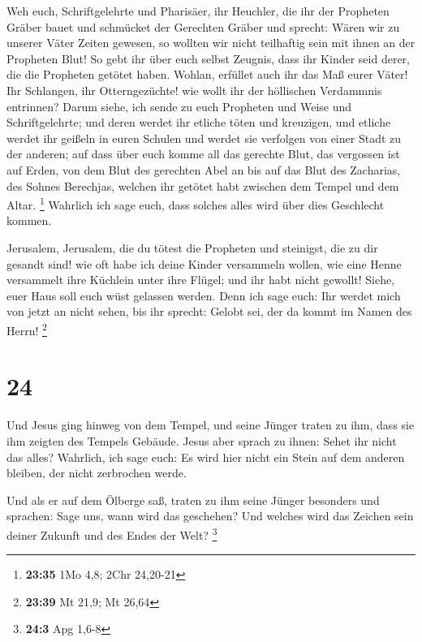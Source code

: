  Weh euch, Schriftgelehrte und Pharisäer, ihr Heuchler,
die ihr der Propheten Gräber bauet und schmücket der Gerechten Gräber
 und sprecht: Wären wir zu unserer Väter Zeiten gewesen,
so wollten wir nicht teilhaftig sein mit ihnen an der Propheten Blut!
 So gebt ihr über euch selbst Zeugnis, dass ihr Kinder
seid derer, die die Propheten getötet haben.  Wohlan,
erfüllet auch ihr das Maß eurer Väter!  Ihr Schlangen,
ihr Otterngezüchte! wie wollt ihr der höllischen Verdammnis entrinnen?
 Darum siehe, ich sende zu euch Propheten und Weise und
Schriftgelehrte; und deren werdet ihr etliche töten und kreuzigen, und
etliche werdet ihr geißeln in euren Schulen und werdet sie verfolgen von
einer Stadt zu der anderen;  auf dass über euch komme all
das gerechte Blut, das vergossen ist auf Erden, von dem Blut des
gerechten Abel an bis auf das Blut des Zacharias, des Sohnes Berechjas,
welchen ihr getötet habt zwischen dem Tempel und dem Altar. \footnote{\textbf{23:35}
  1Mo 4,8; 2Chr 24,20-21}  Wahrlich ich sage euch, dass
solches alles wird über dies Geschlecht kommen.

 Jerusalem, Jerusalem, die du tötest die Propheten und
steinigst, die zu dir gesandt sind! wie oft habe ich deine Kinder
versammeln wollen, wie eine Henne versammelt ihre Küchlein unter ihre
Flügel; und ihr habt nicht gewollt!  Siehe, euer Haus
soll euch wüst gelassen werden.  Denn ich sage euch: Ihr
werdet mich von jetzt an nicht sehen, bis ihr sprecht: Gelobt sei, der
da kommt im Namen des Herrn! \footnote{\textbf{23:39} Mt 21,9; Mt 26,64}

\hypertarget{section-12}{%
\section{24}\label{section-12}}

 Und Jesus ging hinweg von dem Tempel, und seine Jünger
traten zu ihm, dass sie ihm zeigten des Tempels Gebäude. 
Jesus aber sprach zu ihnen: Sehet ihr nicht das alles? Wahrlich, ich
sage euch: Es wird hier nicht ein Stein auf dem anderen bleiben, der
nicht zerbrochen werde.

 Und als er auf dem Ölberge saß, traten zu ihm seine
Jünger besonders und sprachen: Sage uns, wann wird das geschehen? Und
welches wird das Zeichen sein deiner Zukunft und des Endes der Welt?
\footnote{\textbf{24:3} Apg 1,6-8}

